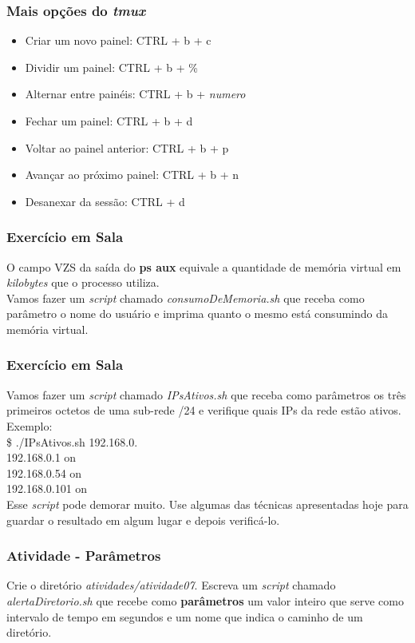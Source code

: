\documentclass{beamer}
\begin{document}
   \begin{frame}
      \frametitle{Mais opções do \textit{tmux}}
      \begin{itemize}
         \item Criar um novo painel: CTRL + b + c
         \item Dividir um painel: CTRL + b + \%
         \item Alternar entre painéis: CTRL + b + \textit{numero}
         \item Fechar um painel: CTRL + b + d
         \item Voltar ao painel anterior: CTRL + b + p
         \item Avançar ao próximo painel: CTRL + b + n
         \item Desanexar da sessão: CTRL + d
      \end{itemize}
   \end{frame}


   \begin{frame}
      \frametitle{Exercício em Sala}
      O campo VZS da saída do \textbf{ps aux} equivale a quantidade de memória virtual em \textit{kilobytes} que o processo utiliza. \\
      Vamos fazer um \textit{script} chamado \textit{consumoDeMemoria.sh} que receba como parâmetro o nome do usuário e imprima quanto o mesmo está consumindo da memória virtual. \\
   \end{frame}

   \begin{frame}
     \frametitle{Exercício em Sala}
      Vamos fazer um \textit{script} chamado \textit{IPsAtivos.sh} que receba como parâmetros os três primeiros octetos de uma sub-rede \slash 24 e verifique quais IPs da rede estão ativos. \\
      Exemplo: \\
      \$ ./IPsAtivos.sh 192.168.0. \\
      192.168.0.1   on \\
      192.168.0.54  on \\
      192.168.0.101 on \\
      Esse \textit{script} pode demorar muito. Use algumas das técnicas apresentadas hoje para guardar o resultado em algum lugar e depois verificá-lo. \\
   \end{frame}

   \begin{frame}
      \frametitle{Atividade - Parâmetros}
      Crie o diretório \textit{atividades/atividade07}. Escreva um \textit{script} chamado \textit{alertaDiretorio.sh} que recebe como \textbf{parâmetros} um valor inteiro que serve como intervalo de tempo em segundos e um nome que indica o caminho de um diretório. \\
   \end{frame}
\end{document}
